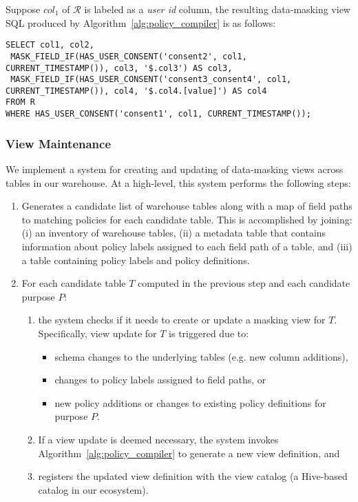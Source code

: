 Suppose $col_1$ of $\mathcal{R}$ is labeled as a \emph{user id} column, the resulting data-masking view SQL produced by Algorithm~\ref{alg:policy_compiler} is as follows:
\begin{lstlisting} 
SELECT col1, col2, 
 MASK_FIELD_IF(HAS_USER_CONSENT('consent2', col1, CURRENT_TIMESTAMP()), col3, '$.col3') AS col3,
 MASK_FIELD_IF(HAS_USER_CONSENT('consent3_consent4', col1, CURRENT_TIMESTAMP()), col4, '$.col4.[value]') AS col4
FROM R
WHERE HAS_USER_CONSENT('consent1', col1, CURRENT_TIMESTAMP());
\end{lstlisting}

\subsubsection{View Maintenance}
We implement a system for creating and updating of data-masking views across tables in our warehouse. At a high-level, this system performs the following steps: 
\begin{enumerate} 
    \item Generates a candidate list of warehouse tables along with a map of field paths to matching policies for each candidate table. This is accomplished by joining: (i) an inventory of warehouse tables, (ii) a metadata table that contains information about policy labels assigned to each field path of a table, and (iii) a table containing policy labels and policy definitions. 
    \item For each candidate table $T$ computed in the previous step and each candidate purpose $P$:
    \begin{enumerate}
    \item the system checks if it needs to create or update a masking view for $T$. Specifically, view update for $T$ is triggered due to: 
    \begin{itemize}
        \item schema changes to the underlying tables (e.g. new column additions), 
        \item changes to policy labels assigned to field paths, or 
        \item new policy additions or changes to existing policy definitions for purpose $P$.
    \end{itemize}
    \item If a view update is deemed necessary, the system invokes Algorithm~\ref{alg:policy_compiler} to generate a new view definition, and 
    \item registers the updated view definition with the view catalog (a Hive-based~\cite{hive} catalog in our ecosystem). 
    \end{enumerate}
\end{enumerate}

